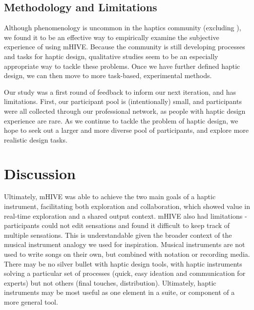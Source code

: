\subsection{Methodology and Limitations}

Although phenomenology is uncommon in the haptics community (excluding \cite{Obrist2013}), we found it to be an effective way to empirically examine the subjective experience of using mHIVE.
Because the community is still developing processes and tasks for haptic design, qualitative studies seem to be an especially appropriate way to tackle these problems.
Once we have further defined haptic design, we can then move to more task-based, experimental methods.

Our study was a first round of feedback to inform our next iteration, and has limitations.
First, our participant pool is (intentionally) small,
and participants were all collected through our professional network, as people with haptic design experience are rare.
As we continue to tackle the problem of haptic design, we hope to seek out a larger and more diverse pool of participants, and %
explore more realistic design tasks. %



%
% 
\section{Discussion}
Ultimately,
mHIVE was able to achieve the two main goals of a haptic instrument, facilitating both exploration and collaboration, which showed value in real-time exploration and a shared output context.
mHIVE also had limitations - participants could not edit sensations and found it difficult to keep track of multiple sensations.
This is understandable given the broader context of the musical instrument analogy we used for inspiration.
Musical instruments are not used to write songs on their own, but %
combined with notation or recording media.
There may be no silver bullet with haptic design tools, with haptic instruments solving a particular set of processes (quick, easy ideation and communication for experts) but not others (final touches, distribution).
Ultimately, haptic instruments may be most useful as one element
in a suite, or component of a more general tool.

